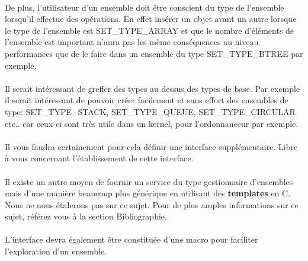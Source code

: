 \documentclass[10pt,a4wide]{article}
\begin{document}
\paragraph{}

De plus, l'utilisateur d'un ensemble doit \^etre conscient du type
de l'ensemble lorsqu'il effectue des op\'erations. En effet ins\'erer
un objet avant un autre lorsque le type de l'ensemble est SET\_TYPE\_ARRAY
et que le nombre d'\'el\'ements de l'ensemble est important n'aura pas les
m\^eme cons\'equences au niveau performances que de le faire dans un
ensemble du type SET\_TYPE\_BTREE par exemple.

\paragraph{}

Il serait int\'eressant de greffer des types au dessus des types de base.
Par exemple il serait int\'eressant de pouvoir cr\'eer facilement et
sans effort des ensembles de type: SET\_TYPE\_STACK, SET\_TYPE\_QUEUE,
SET\_TYPE\_CIRCULAR etc.. car ceux-ci sont tr\`es utile dans un kernel,
pour l'ordonnanceur par exemple.

\paragraph{}

Il vous faudra certainement pour cela d\'efinir une interface suppl\'ementaire.
Libre \`a vous concernant l'\'etablissement de cette interface.

\paragraph{}

Il existe un autre moyen de fournir un service du type gestionnaire d'ensembles
mais d'une mani\`ere beaucoup plus g\'en\'erique en utilisant des
\textbf{templates} en C. Nous ne nous \'etalerons pas sur ce sujet. Pour
de plus amples informations sur ce sujet, r\'ef\'erez vous \`a la
section Bibliographie.

\paragraph{}

L'interface devra \'egalement \^etre constitu\'ee d'une macro pour faciliter
l'exploration d'un ensemble.

\paragraph{}
\end{document}
